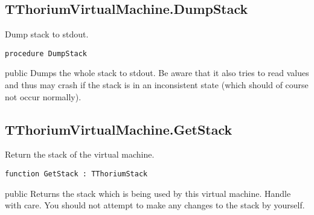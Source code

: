 \subsection{TThoriumVirtualMachine.DumpStack}
\label{thoriumcorepkg:thorium:tthoriumvirtualmachine:dumpstack}
\begin{FPCList}
\Synopsis
Dump stack to stdout.\Declaration 

\begin{verbatim}
procedure DumpStack
\end{verbatim}
\Visibility
public
\Description
Dumps the whole stack to stdout. Be aware that it also tries to read values and thus may crash if the stack is in an inconsistent state (which should of course not occur normally).\end{FPCList}
\subsection{TThoriumVirtualMachine.GetStack}
\label{thoriumcorepkg:thorium:tthoriumvirtualmachine:getstack}
\begin{FPCList}
\Synopsis
Return the stack of the virtual machine.\Declaration 

\begin{verbatim}
function GetStack : TThoriumStack
\end{verbatim}
\Visibility
public
\Description
Returns the stack which is being used by this virtual machine. Handle with care. You should not attempt to make any changes to the stack by yourself.\end{FPCList}
